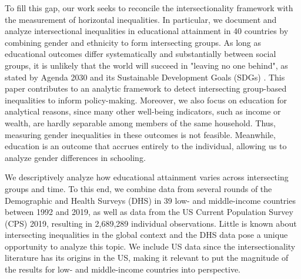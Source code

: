 To fill this gap, our work seeks to reconcile the intersectionality framework with the measurement of horizontal inequalities. In particular, we document and analyze intersectional inequalities in educational attainment in 40 countries by combining gender and ethnicity to form intersecting groups. As long as educational outcomes differ systematically and substantially between social groups, it is unlikely that the world will succeed in "leaving no one behind", as stated by Agenda 2030 and its Sustainable Development Goals (SDGs) \citep{Stuart2016}. This paper contributes to an analytic framework to detect intersecting group-based inequalities to inform policy-making. Moreover, we also focus on education for analytical reasons, since many other well-being indicators, such as income or wealth, are hardly separable among members of the same household. Thus, measuring gender inequalities in these outcomes is not feasible. Meanwhile, education is an outcome that accrues entirely to the individual, allowing us to analyze gender differences in schooling. 

We descriptively analyze how educational attainment varies across intersecting groups and time. To this end, we combine data from several rounds of the Demographic and Health Surveys (DHS) in 39 low- and middle-income countries between 1992 and 2019, as well as data from the US Current Population Survey (CPS) 2019, resulting in 2,689,289 individual observations. Little is known about intersecting inequalities in the global context and the DHS data pose a unique opportunity to analyze this topic. We include US data since the intersectionality literature has its origins in the US, making it relevant to put the magnitude of the results for low- and middle-income countries into perspective. 

